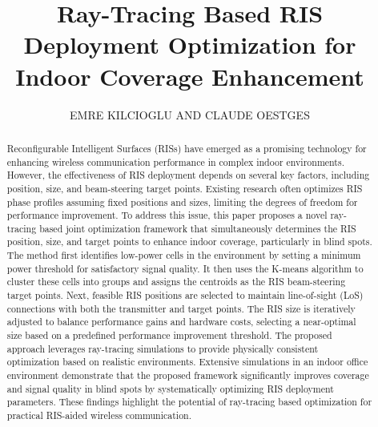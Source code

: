 \documentclass{IEEEoj}
\begin{document}

\title{Ray-Tracing Based RIS Deployment Optimization for Indoor Coverage Enhancement}

\author{EMRE KILCIOGLU AND CLAUDE OESTGES}

\begin{abstract}
Reconfigurable Intelligent Surfaces (RISs) have emerged as a promising technology for enhancing wireless communication performance in complex indoor environments. However, the effectiveness of RIS deployment depends on several key factors, including position, size, and beam-steering target points. Existing research often optimizes RIS phase profiles assuming fixed positions and sizes, limiting the degrees of freedom for performance improvement. To address this issue, this paper proposes a novel ray-tracing based joint optimization framework that simultaneously determines the RIS position, size, and target points to enhance indoor coverage, particularly in blind spots. The method first identifies low-power cells in the environment by setting a minimum power threshold for satisfactory signal quality. It then uses the K-means algorithm to cluster these cells into groups and assigns the centroids as the RIS beam-steering target points. Next, feasible RIS positions are selected to maintain line-of-sight (LoS) connections with both the transmitter and target points. The RIS size is iteratively adjusted to balance performance gains and hardware costs, selecting a near-optimal size based on a predefined performance improvement threshold. The proposed approach leverages ray-tracing simulations to provide physically consistent optimization based on realistic environments. Extensive simulations in an indoor office environment demonstrate that the proposed framework significantly improves coverage and signal quality in blind spots by systematically optimizing RIS deployment parameters. These findings highlight the potential of ray-tracing based optimization for practical RIS-aided wireless communication.
\end{abstract}
\end{document}
